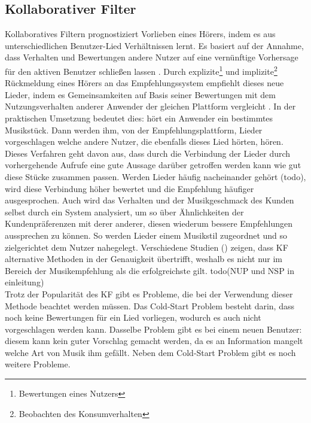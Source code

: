 \documentclass[twosided,a4,10pt]{article}
\begin{document}
\begin{multicols}{2}
		\subsection{Kollaborativer Filter}
		Kollaboratives Filtern prognostiziert Vorlieben eines Hörers, indem es aus unterschiedlichen Benutzer-Lied Verhältnissen lernt. Es basiert auf der Annahme, dass Verhalten und Bewertungen andere Nutzer auf eine vernünftige Vorhersage für den aktiven Benutzer schließen lassen \cite{celma}. Durch explizite\footnote[2]{ Bewertungen eines Nutzers} und implizite\footnote[3]{Beobachten des Konsumverhalten} Rückmeldung eines Hörers an das Empfehlungssystem empfiehlt dieses neue Lieder, indem es Gemeinsamkeiten auf Basis seiner Bewertungen mit dem Nutzungsverhalten anderer Anwender der gleichen Plattform vergleicht \cite{mcfee}.\newline
		In der praktischen Umsetzung bedeutet dies: hört ein Anwender ein bestimmtes Musikstück. Dann werden ihm, von der Empfehlungsplattform, Lieder vorgeschlagen welche andere Nutzer, die ebenfalls dieses Lied hörten, hören. Dieses Verfahren geht davon aus, dass durch die Verbindung der Lieder durch vorhergehende Aufrufe eine gute Aussage darüber getroffen werden kann wie gut diese Stücke zusammen passen. Werden Lieder häufig nacheinander gehört (todo), wird diese Verbindung höher bewertet und die Empfehlung häufiger ausgesprochen. Auch wird das Verhalten und der Musikgeschmack des Kunden selbst durch ein System analysiert, um so über Ähnlichkeiten der Kundenpräferenzen mit derer anderer, diesen wiederum bessere Empfehlungen aussprechen zu können. So werden Lieder einem Musikstil zugeordnet und so zielgerichtet dem Nutzer nahegelegt.\newline
		Verschiedene Studien (\cite{mcfee}\cite{barrington}) zeigen, dass KF alternative Methoden in der Genauigkeit übertrifft, weshalb es nicht nur im Bereich der Musikempfehlung als die erfolgreichste gilt.\newline
		todo(NUP und NSP in einleitung)\\
		Trotz der Popularität des KF gibt es Probleme, die bei der Verwendung dieser Methode beachtet werden müssen. Das Cold-Start Problem besteht darin, dass noch keine Bewertungen für ein Lied vorliegen, wodurch es auch nicht vorgeschlagen werden kann. Dasselbe Problem gibt es bei einem neuen Benutzer: diesem kann kein guter Vorschlag gemacht werden, da es an Information mangelt welche Art von Musik ihm gefällt. Neben dem Cold-Start Problem gibt es noch weitere Probleme. \cite{celma} 
		

\end{multicols}
\end{document}
